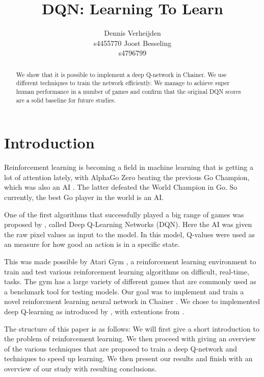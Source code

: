 \documentclass{article}
\title{DQN: Learning To Learn}
\author{
  Dennis Verheijden\\
  s4455770
  \And
  Joost Besseling\\
  s4796799
}
\begin{document}

\maketitle

\begin{abstract}
We show that it is possible to implement a deep Q-network in Chainer. We use different techniques to train the network efficiently. We manage to achieve super human performance in a number of games and confirm that the original DQN scores are a solid baseline for future studies.
\end{abstract}

\section{Introduction}
Reinforcement learning is becoming a field in machine learning that is getting a lot of attention lately, with AlphaGo Zero beating the previous Go Champion, which was also an AI \cite{silver2017mastering}. The latter defeated the World Champion in Go. So currently, the best Go player in the world is an AI.

One of the first algorithms that successfully played a big range of games was proposed by \citep{mnih2013playing}, called Deep Q-Learning Networks (DQN). Here the AI was given the raw pixel values as input to the model. In this model, Q-values were used as an measure for how good an action is in a specific state.

This was made possible by Atari Gym \cite{1606.01540}, a reinforcement learning environment to train and test various reinforcement learning algorithms on difficult, real-time, tasks. The gym has a large variety of different games that are commonly used as a benchmark tool for testing models. Our goal was to implement and train a novel  reinforcment learning neural network in Chainer \cite{chainer_learningsys2015}. We chose to implemented deep Q-learning as introduced by \cite{mnih2013playing}, with extentions from \cite{mnih2015human}.

The structure of this paper is as follows: We will first give a short introduction to the problem of reinforcement learning. We then proceed with giving an overview of the various techniques that are proposed to train a deep Q-network and techniques to speed up learning. We then present our results and finish with an overview of our study with resulting conclusions.
\end{document}
